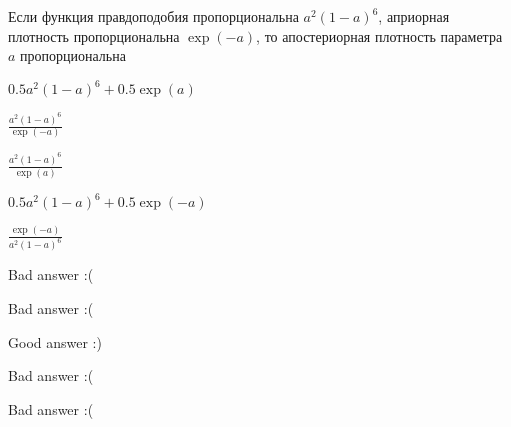 
\begin{question}
Если функция правдоподобия пропорциональна \(a^2(1-a)^6\), априорная
плотность пропорциональна \(\exp(-a)\), то апостериорная плотность
параметра \(a\) пропорциональна
\begin{answerlist}
  \item \(0.5 a^2(1-a)^6 +0.5\exp(a)\)
  \item \(\frac{a^2(1-a)^6}{\exp(-a)}\)
  \item \(\frac{a^2(1-a)^6}{\exp(a)}\)
  \item \(0.5 a^2(1-a)^6 +0.5\exp(-a)\)
  \item \(\frac{\exp(-a)}{a^2(1-a)^6}\)
\end{answerlist}
\end{question}

\begin{solution}
\begin{answerlist}
  \item Bad answer :(
  \item Bad answer :(
  \item Good answer :)
  \item Bad answer :(
  \item Bad answer :(
\end{answerlist}
\end{solution}

